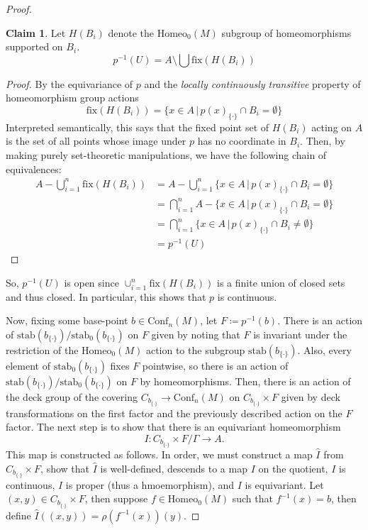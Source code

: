 \documentclass[10pt, oneside]{article}
\newcommand{\homeo}[1][S^1]{\text{Homeo}_0(#1)}
\newcommand{\conf}[2][S^1]{\text{Conf}_{#2}(#1)}
\newcommand{\set}{{\{\cdot\}}}
\theoremstyle{definition}
\newtheorem*{clm*}{Claim}
\theoremstyle{definition}
\begin{document}
\begin{proof}
    \begin{clm*}
        Let $H(B_i)$ denote the $\homeo[M]$ subgroup of homeomorphisms supported on $B_i$.
        $$p^{-1}(U) = A \setminus \bigcup \text{fix}(H(B_i))$$
    \end{clm*}
    \begin{proof}
        By the equivariance of $p$ 
        and the \textit{locally continuously transitive} property of homeomorphism group actions
        $$\text{fix}(H(B_i)) = \{x\in A\, |\, p(x)_\set\cap B_i = \emptyset\}$$
        Interpreted semantically,
        this says that 
        the fixed point set of $H(B_i)$ acting on $A$ is 
        the set of all points whose image under $p$ has no coordinate in $B_i$. 
        Then, by making purely set-theoretic manipulations, 
        we have the following chain of equivalences:
        \begin{align*}
            A - \bigcup_{i=1}^n\text{fix}(H(B_i)) &= A - \bigcup_{i=1}^n\{x\in A\, |\, p(x)_\set\cap B_i = \emptyset\}\\
            &= \bigcap_{i=1}^n A - \{x\in A\, |\, p(x)_\set\cap B_i = \emptyset\}\\
            &= \bigcap_{i=1}^n \{x\in A\, |\, p(x)_\set\cap B_i \neq \emptyset\}\\
            &= p^{-1}(U)
        \end{align*}
    \end{proof}
    So,
    $p^{-1}(U)$ is open
    since $\cup_{i=1}^n\text{fix}(H(B_i))$ is a finite union of closed sets
    and thus closed.
    In particular,
    this shows that $p$ is continuous.

    Now,
    fixing some base-point $b\in\conf[M]{n}$,
    let $F\coloneqq p^{-1}(b)$. 
    There is an action of $\text{stab}(b_\set)/\text{stab}_0(b_\set)$
    on $F$ given by noting that $F$ is invariant
    under the restriction of the $\homeo[M]$ action to the subgroup $\text{stab}(b_\set)$.
    Also,
    every element of $\text{stab}_0(b_\set)$ fixes $F$ pointwise,
    so there is an action of $\text{stab}(b_\set)/\text{stab}_0(b_\set)$
    on $F$
    by homeomorphisms.
    Then,
    there is an action
    of the deck group
    of the covering $C_{b_\set}\to \conf[M]{n}$
    on $C_{b_\set}\times F$ 
    given by deck transformations on the first factor
    and the previously described action on the $F$ factor.
    The next step is to show that there is an equivariant homeomorphism
    $$I:C_{b_\set}\times F / \Gamma \to A.$$
    This map is constructed as follows.
    In order, 
    we must construct a map $\hat{I}$ from $C_{b_\set} \times F$,
    show that $\hat{I}$ is well-defined,
    descends to a map $I$ on the quotient,
    $I$ is continuous,
    $I$ is proper (thus a hmoemorphism), and
    $I$ is equivariant.
    Let $(x, y)\in C_{b_\set}\times F$, then
    suppose $f\in\homeo[M]$ such that $f^{-1}(x) = b$,
    then define $\hat{I}((x,y)) = \rho(f^{-1}(x))(y)$.
    
    
\end{proof}
\end{document}
